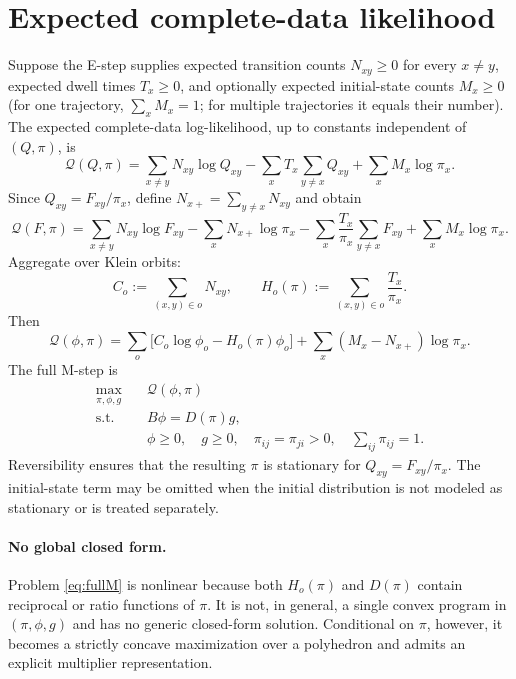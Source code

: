 \documentclass[10pt]{article}
\begin{document}
\section{Expected complete-data likelihood}
Suppose the E-step supplies expected transition counts $N_{xy}\ge0$ for every $x\ne y$, expected dwell times $T_x\ge0$, and optionally expected initial-state counts $M_x\ge0$ (for one trajectory, $\sum_xM_x=1$; for multiple trajectories it equals their number).  The expected complete-data log-likelihood, up to constants independent of $(Q,\pi)$, is
\begin{equation}\label{eq:Qq}
\mathcal Q(Q,\pi)=\sum_{x\ne y}N_{xy}\log Q_{xy}-\sum_xT_x\sum_{y\ne x}Q_{xy}+\sum_xM_x\log\pi_x.
\end{equation}
Since $Q_{xy}=F_{xy}/\pi_x$, define $N_{x+}=\sum_{y\ne x}N_{xy}$ and obtain
\begin{equation}\label{eq:QFpi}
\mathcal Q(F,\pi)=\sum_{x\ne y}N_{xy}\log F_{xy}-\sum_xN_{x+}\log\pi_x-\sum_x\frac{T_x}{\pi_x}\sum_{y\ne x}F_{xy}+\sum_xM_x\log\pi_x.
\end{equation}
Aggregate over Klein orbits:
\begin{equation}
C_o:=\sum_{(x,y)\in o}N_{xy},\qquad
H_o(\pi):=\sum_{(x,y)\in o}\frac{T_x}{\pi_x}.
\end{equation}
Then
\begin{equation}\label{eq:orbitobj}
\mathcal Q(\phi,\pi)=\sum_o\bigl[C_o\log\phi_o-H_o(\pi)\phi_o\bigr]+\sum_x(M_x-N_{x+})\log\pi_x.
\end{equation}
The full M-step is
\begin{equation}\label{eq:fullM}
\begin{aligned}
\max_{\pi,\phi,g}\quad &\mathcal Q(\phi,\pi)\\
\text{s.t.}\quad &B\phi=D(\pi)g,\\
&\phi\ge0,\quad g\ge0,\quad \pi_{ij}=\pi_{ji}>0,\quad \sum_{ij}\pi_{ij}=1.
\end{aligned}
\end{equation}
Reversibility ensures that the resulting $\pi$ is stationary for $Q_{xy}=F_{xy}/\pi_x$.  The initial-state term may be omitted when the initial distribution is not modeled as stationary or is treated separately.

\paragraph{No global closed form.}
Problem \eqref{eq:fullM} is nonlinear because both $H_o(\pi)$ and $D(\pi)$ contain reciprocal or ratio functions of $\pi$.  It is not, in general, a single convex program in $(\pi,\phi,g)$ and has no generic closed-form solution.  Conditional on $\pi$, however, it becomes a strictly concave maximization over a polyhedron and admits an explicit multiplier representation.
\end{document}
